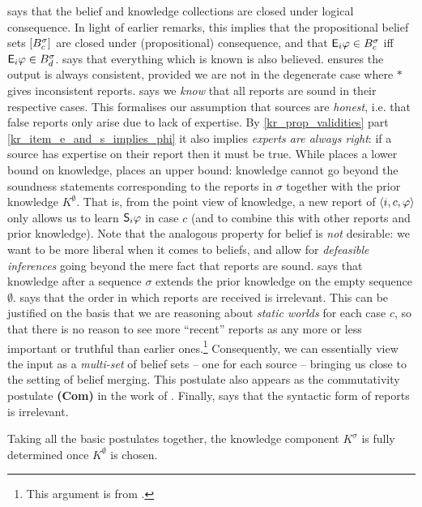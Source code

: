 \closure{} says that the belief and knowledge collections are closed under
logical consequence. In light of earlier remarks,
this implies that the propositional belief sets $\proppart{B^\sigma_c}$ are
closed under (propositional) consequence, and that $\E_i\phi \in B^\sigma_c$
iff $\E_i\phi \in B^\sigma_d$.
%
\containment{} says that everything which is known is also believed.
%
\consistency{} ensures the output is always consistent, provided
we are not in the degenerate case where $\ast$ gives inconsistent reports.
%
\soundness{} says we \emph{know} that all reports are sound in their respective
cases. This formalises our assumption that sources are \emph{honest}, i.e. that
false reports only arise due to lack of expertise. By \cref{kr_prop_validities}
part \cref{kr_item_e_and_s_implies_phi} it also implies \emph{experts are
always right}: if a source has expertise on their report then it must be true.
%
While \soundness{} places a lower bound on knowledge, \kbound{} places an upper
bound: knowledge cannot go beyond the soundness statements corresponding to the
reports in $\sigma$ together with the prior knowledge $K^\emptyset$. That is,
from the point view of knowledge, a new report of $\tuple{i, c, \phi}$ only
allows us to learn $\S_i\phi$ in case $c$ (and to combine this with other
reports and prior knowledge). Note that the analogous property for belief is
\emph{not} desirable: we want to be more liberal when it comes to beliefs, and
allow for \emph{defeasible inferences} going beyond the mere fact that reports
are sound.
%
\priorext{} says that knowledge after a sequence $\sigma$ extends the prior
knowledge on the empty sequence $\emptyset$.
%
\rearr{} says that the order in which reports are received is irrelevant. This
can be justified on the basis that we are reasoning about \emph{static worlds}
for each case $c$, so that there is no reason
to see more ``recent'' reports as any more or less important or truthful than
earlier ones.\footnote{This argument is from \cite{delgrande2006iterated}.}
Consequently, we can essentially view the input as a \emph{multi-set} of belief
sets -- one for each source -- bringing us close to the setting of belief
merging. This postulate also appears as the commutativity postulate
\textbf{(Com)} in the work of \textcite{schwind2020}.
%
Finally, \equivpost{} says that the syntactic form of reports is irrelevant.

Taking all the basic postulates together, the knowledge component $K^\sigma$ is
fully determined once $K^\emptyset$ is chosen.

